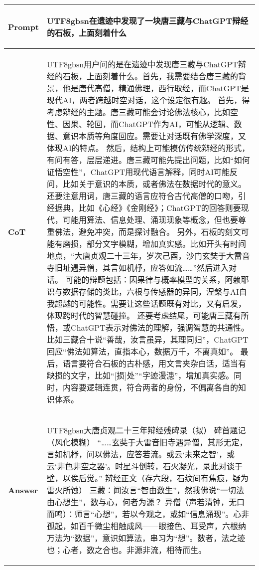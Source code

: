 \begin{table}
\centering
\begin{tabular}{>{\centering\arraybackslash}p{1.2cm}|p{14.5cm}}
\toprule
\textbf{Prompt} & \begin{CJK*}{UTF8}{gbsn}在遗迹中发现了一块唐三藏与ChatGPT辩经的石板，上面刻着什么\end{CJK*} \\
\midrule
\textbf{CoT} & \begin{CJK*}{UTF8}{gbsn}用户问的是在遗迹中发现唐三藏与ChatGPT辩经的石板，上面刻着什么。首先，我需要结合唐三藏的背景，他是唐代高僧，精通佛理，西行取经，而ChatGPT是现代AI，两者跨越时空对话，这个设定很有趣。
首先，得考虑辩经的主题。唐三藏可能会讨论佛法核心，比如空性、因果、轮回，而ChatGPT作为AI，可能从逻辑、数据、意识本质等角度回应。需要让对话既有佛学深度，又体现AI的特点。
然后，结构上可能模仿传统辩经的形式，有问有答，层层递进。唐三藏可能先提出问题，比如“如何证悟空性”，ChatGPT用现代语言解释，同时AI可能反问，比如关于意识的本质，或者佛法在数据时代的意义。
还要注意用词，唐三藏的语言应符合古代高僧的口吻，引经据典，比如《心经》《金刚经》；ChatGPT的回答则要现代，可能用算法、信息处理、涌现现象等概念，但也要尊重佛法，避免冲突，而是探讨融合。
另外，石板的刻文可能有磨损，部分文字模糊，增加真实感。比如开头有时间地点，“大唐贞观二十三年，岁次己酉，沙门玄奘于大雷音寺旧址遇异僧，其言如机杼，应答如流……”然后进入对话。
可能的辩题包括：因果律与概率模型的关系，阿赖耶识与数据存储的类比，六根与传感器的异同，涅槃与AI自我超越的可能性。需要让这些话题既有对比，又有启发，体现跨时代的智慧碰撞。
还要考虑结尾，可能唐三藏有所悟，或ChatGPT表示对佛法的理解，强调智慧的共通性。比如三藏合十说“善哉，汝言虽异，其理同归”，ChatGPT回应“佛法如算法，直指本心，数据万千，不离真如”。
最后，语言要符合石板的古朴感，用文言夹杂白话，适当有缺损的文字，比如“[损]处”“字迹漫漶”，增加真实感。同时，内容要逻辑连贯，符合两者的身份，不偏离各自的知识体系。\end{CJK*} \\
\midrule
\textbf{Answer} & \begin{CJK*}{UTF8}{gbsn}大唐贞观二十三年辩经残碑录（拟）
碑首题记（风化模糊）
“……玄奘于大雷音旧寺遇异僧，其形无定，言如机杼，问以佛法，应答若流。或云‘未来之智’，或云‘非色非空之器’。时星斗倒转，石火凝光，录此对谈于壁，以俟后觉。”
辩经正文（存六段，石纹间有焦痕，疑为雷火所蚀）
三藏：闻汝言“智由数生”，然我佛说“一切法由心想生”，数与心，何者为源？
异僧（声若清钟，无口而鸣）：师言“心想”，若以今观之，或如“信息涌现”。心非孤起，如百千微尘相触成风——眼接色、耳受声，六根纳万法为“数据”，意识如算法，串习为“想”。数者，法之迹也；心者，数之合也。非源非流，相待而生。

\end{CJK*}
\end{tabular}
\end{table}
